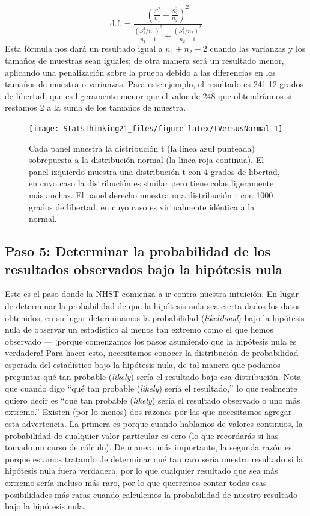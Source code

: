 \documentclass[
  12pt,
]{book}
\begin{document}
\[
 \mathrm{d.f.} = \frac{\left(\frac{S_1^2}{n_1} + \frac{S_2^2}{n_2}\right)^2}{\frac{\left(S_1^2/n_1\right)^2}{n_1-1} + \frac{\left(S_2^2/n_2\right)^2}{n_2-1}}
\]
Esta fórmula nos dará un resultado igual a \(n_1 + n_2 - 2\) cuando las varianzas y los tamaños de muestras sean iguales; de otra manera será un resultado menor, aplicando una penalización sobre la prueba debido a las diferencias en los tamaños de muestra o varianzas. Para este ejemplo, el resultado es 241.12 grados de libertad, que es ligeramente menor que el valor de 248 que obtendríamos si restamos 2 a la suma de los tamaños de muestra.

\begin{figure}
\texttt{[image: StatsThinking21\_files/figure-latex/tVersusNormal-1]} \caption{Cada panel muestra la distribución t (la línea azul punteada) sobrepuesta a la distribución normal (la línea roja continua). El panel izquierdo muestra una distribución t con 4 grados de libertad, en cuyo caso la distribución es similar pero tiene colas ligeramente más anchas. El panel derecho muestra una distribución t con 1000 grados de libertad, en cuyo caso es virtualmente idéntica a la normal.}\label{fig:tVersusNormal}
\end{figure}

\hypertarget{paso-5-determinar-la-probabilidad-de-los-resultados-observados-bajo-la-hipuxf3tesis-nula}{%
\subsection{Paso 5: Determinar la probabilidad de los resultados observados bajo la hipótesis nula}\label{paso-5-determinar-la-probabilidad-de-los-resultados-observados-bajo-la-hipuxf3tesis-nula}}

Este es el paso donde la NHST comienza a ir contra nuestra intuición. En lugar de determinar la probabilidad de que la hipótesis nula sea cierta dados los datos obtenidos, en su lugar determinamos la probabilidad (\emph{likelihood}) bajo la hipótesis nula de observar un estadístico al menos tan extremo como el que hemos observado --- ¡porque comenzamos los pasos asumiendo que la hipótesis nula es verdadera! Para hacer esto, necesitamos conocer la distribución de probabilidad esperada del estadístico bajo la hipótesis nula, de tal manera que podamos preguntar qué tan probable (\emph{likely}) sería el resultado bajo esa distribución. Nota que cuando digo ``qué tan probable (\emph{likely}) sería el resultado,'' lo que realmente quiero decir es ``qué tan probable (\emph{likely}) sería el resultado observado o uno más extremo.'' Existen (por lo menos) dos razones por las que necesitamos agregar esta advertencia. La primera es porque cuando hablamos de valores continuos, la probabilidad de cualquier valor particular es cero (lo que recordarás si has tomado un curso de cálculo). De manera más importante, la segunda razón es porque estamos tratando de determinar qué tan raro sería nuestro resultado si la hipótesis nula fuera verdadera, por lo que cualquier resultado que sea más extremo sería incluso más raro, por lo que querremos contar todas esas posibilidades más raras cuando calculemos la probabilidad de nuestro resultado bajo la hipótesis nula.
\end{document}
